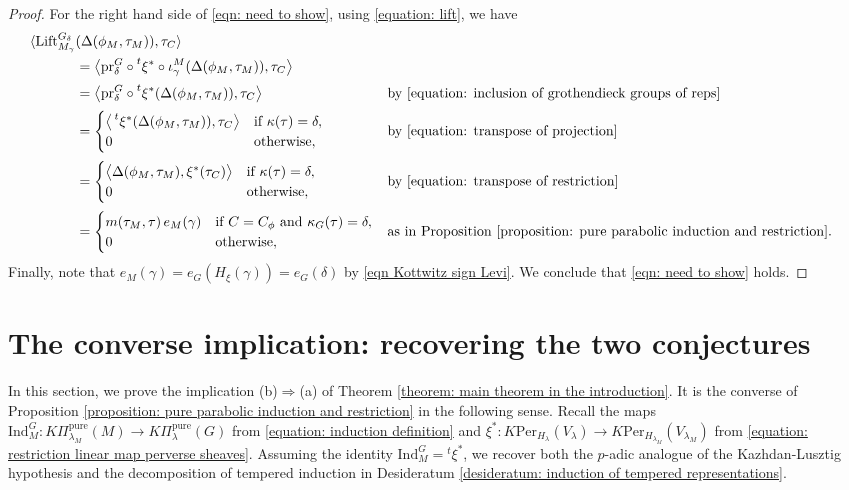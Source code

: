 \documentclass[11pt,letterpaper]{amsart}
\newcommand{\pure}{\mathrm{pure}}
\newcommand{\pr}{\mathrm{pr}}
\newcommand{\Ind}{\mathrm{Ind}}
\newcommand{\Per}{\mathrm{Per}}
\newcommand{\Lift}{\mathrm{Lift}}
\newcommand{\stsh}[2]{{#1}_{#2}}
\renewcommand{\1}{\mathbbm{1}}
\numberwithin{equation}{section}
\begin{document}
{\begin{proof}
For the right hand side of \eqref{eqn: need to show}, using \eqref{equation: lift}, we have
\begin{align*}
   \langle \Lift_{M_\gamma}^{G_\delta}&(\Delta(\phi_M, \tau_M)), \stsh{\tau}{C}\rangle\\
   &= \big\langle \pr^G_\delta \circ \prescript{t}{}{\xi^*} \circ \iota^M_\gamma (\Delta(\phi_M, \tau_M)), \stsh{\tau}{C}\big\rangle\\[2pt]
   &= \big\langle \pr^G_\delta \circ \prescript{t}{}{\xi^*} (\Delta(\phi_M,\tau_M)),\stsh{\tau}{C}\big\rangle
      && \text{by }\eqref{equation: inclusion of grothendieck groups of reps}\\[2pt]
   &= \begin{cases}
        \big\langle \prescript{t}{}{\xi^*} (\Delta(\phi_M,\tau_M)), \stsh{\tau}{C}\big\rangle & \text{if }\kappa(\tau)=\delta,\\
        0 & \text{otherwise},
      \end{cases}
      && \text{by }\eqref{equation: transpose of projection}\\[2pt]
   &= \begin{cases}
        \big\langle \Delta(\phi_M,\tau_M), \xi^*(\stsh{\tau}{C})\big\rangle & \text{if }\kappa(\tau)=\delta,\\
        0 & \text{otherwise},
      \end{cases}
      && \text{by }\eqref{equation: transpose of restriction}\\[2pt]
   &= \begin{cases}
        m(\tau_M,\tau)\, e_M(\gamma) & \text{if } C=C_\phi \text{ and } \kappa_G(\tau)=\delta,\\
        0 & \text{otherwise},
      \end{cases}
      && \text{as in Proposition \ref{proposition: pure parabolic induction and restriction}.}
\end{align*}
Finally, note that $e_M(\gamma)= e_{G}(H_{\xi}(\gamma))= e_G(\delta)$ by \eqref{eqn Kottwitz sign Levi}. We conclude that \eqref{eqn: need to show} holds. 
\end{proof}

\section{The converse implication: recovering the two conjectures}\label{section: converse}
In this section, we prove the implication \textup{(b)}$\Rightarrow$\textup{(a)} of Theorem \ref{theorem: main theorem in the introduction}. It is the converse of Proposition \ref{proposition: pure parabolic induction and restriction} in the following sense. Recall the maps $\Ind_M^G:K\Pi_{\lambda_M}^\pure(M)\to K\Pi_\lambda^\pure(G)$ from \eqref{equation: induction definition} and $\xi^*:K\Per_{H_\lambda}(V_\lambda)\to K\Per_{H_{\lambda_M}}(V_{\lambda_M})$ from \eqref{equation: restriction linear map perverse sheaves}. Assuming the identity $\Ind_M^G= {}^t \xi^{\ast}$,  we recover both the $p$-adic analogue of the Kazhdan-Lusztig hypothesis and the decomposition of tempered induction in
Desideratum \ref{desideratum: induction of tempered representations}. 

}
\end{document}
